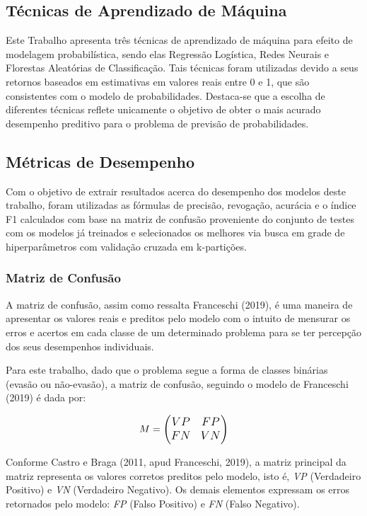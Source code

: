 \documentclass[english, spanish, brazilian]{RBIEarticle} %
\begin{document}
\subsection{Técnicas de Aprendizado de Máquina}
Este Trabalho apresenta três técnicas de aprendizado de máquina para efeito de modelagem probabilística, sendo elas Regressão Logística, Redes Neurais e Florestas Aleatórias de Classificação. Tais técnicas foram utilizadas devido a seus retornos baseados em estimativas em valores reais entre 0 e 1, que são consistentes com o modelo de probabilidades. Destaca-se que a escolha de diferentes técnicas reflete unicamente o objetivo de obter o mais acurado desempenho preditivo para o problema de previsão de probabilidades.

\subsection{Métricas de Desempenho}
Com o objetivo de extrair resultados acerca do desempenho dos modelos deste trabalho, foram utilizadas as fórmulas de precisão, revogação, acurácia e o índice F1 calculados com base na matriz de confusão proveniente do conjunto de testes com os modelos já treinados e selecionados os melhores via busca em grade de hiperparâmetros com validação cruzada em k-partições.


\subsubsection{Matriz de Confusão}
A matriz de confusão, assim como ressalta Franceschi (2019), é uma maneira de apresentar os valores reais e preditos pelo modelo com o intuito de mensurar os erros e acertos em cada classe de um determinado problema para se ter percepção dos seus desempenhos individuais.

Para este trabalho, dado que o problema segue a forma de classes binárias (evasão ou não-evasão), a matriz de confusão, seguindo o modelo de Franceschi (2019) é dada por:

\vspace{0.5cm}
\begin{equation}
\large
M = 
\begin{pmatrix}
VP & FP \\
FN & VN
\end{pmatrix}
\end{equation}
\vspace{0.5cm}

Conforme Castro e Braga (2011, apud Franceschi, 2019), a matriz principal da matriz representa os valores corretos preditos pelo modelo, isto é, \textit{VP} (Verdadeiro Positivo) e \textit{VN} (Verdadeiro Negativo). Os demais elementos expressam os erros retornados pelo modelo: \textit{FP} (Falso Positivo) e \textit{FN} (Falso Negativo).
\end{document}
